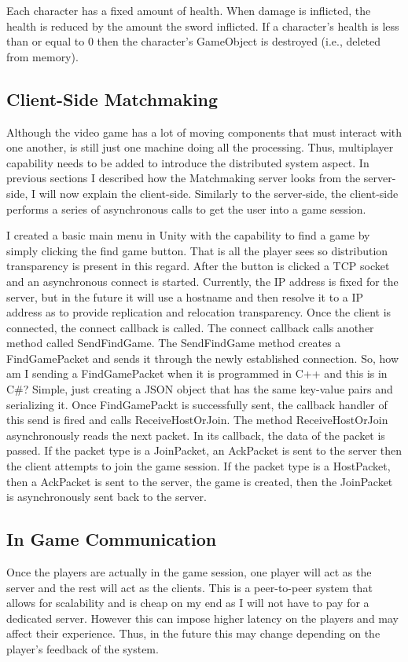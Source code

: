 \documentclass[conference]{IEEEtran}
\begin{document}
Each character has a fixed amount of health.
When damage is inflicted, the health is reduced by the amount the sword inflicted.
If a character’s health is less than or equal to 0 then the character’s GameObject is destroyed (i.e., deleted from memory).

\subsection{Client-Side Matchmaking}
Although the video game has a lot of moving components that must interact with one another, is still just one machine doing all the processing.
Thus, multiplayer capability needs to be added to introduce the distributed system aspect.
In previous sections I described how the Matchmaking server looks from the server-side, I will now explain the client-side.
Similarly to the server-side, the client-side performs a series of asynchronous calls to get the user into a game session.

I created a basic main menu in Unity with the capability to find a game by simply clicking the find game button.
That is all the player sees so distribution transparency is present in this regard.
After the button is clicked a TCP socket and an asynchronous connect is started.
Currently, the IP address is fixed for the server, but in the future it will use a hostname and then resolve it to a IP address as to provide replication and relocation transparency.
Once the client is connected, the connect callback is called.
The connect callback calls another method called SendFindGame.
The SendFindGame method creates a FindGamePacket and sends it through the newly established connection.
So, how am I sending a FindGamePacket when it is programmed in C++ and this is in C\#?
Simple, just creating a JSON object that has the same key-value pairs and serializing it.
Once FindGamePackt is successfully sent, the callback handler of this send is fired and calls ReceiveHostOrJoin.
The method ReceiveHostOrJoin asynchronously reads the next packet.
In its callback, the data of the packet is passed.
If the packet type is a JoinPacket, an AckPacket is sent to the server then the client attempts to join the game session.
If the packet type is a HostPacket, then a AckPacket is sent to the server,  the game is created, then the JoinPacket is asynchronously sent back to the server.

\subsection{In Game Communication}
Once the players are actually in the game session, one player will act as the server and the rest will act as the clients.
This is a peer-to-peer system that allows for scalability and is cheap on my end as I will not have to pay for a dedicated server.
However this can impose higher latency on the players and may affect their experience.
Thus, in the future this may change depending on the player’s feedback of the system.
\end{document}
